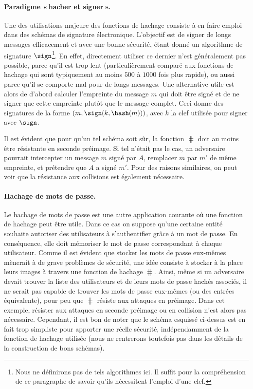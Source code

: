 \paragraph{Paradigme «\,hacher et signer\,».}
Une des utilisations majeure des fonctions de hachage consiste à en faire emploi dans des schémas de signature électronique.
L'objectif est de signer de longs messages efficacement et avec une bonne sécurité, étant donné un algorithme de signature
$\sign$\footnote{Nous ne définirons pas de tels algorithmes ici. Il suffit pour la compréhension de ce paragraphe
de savoir qu'ils nécessitent l'emploi d'une clef.}. En effet, directement utiliser ce dernier n'est généralement pas possible, parce qu'il est trop lent (particulièrement
comparé aux fonctions de hachage qui sont typiquement au moins $500$ à $1000$ fois plus rapide), ou aussi parce qu'il se comporte mal
pour de longs messages. Une alternative utile est alors de d'abord calculer l'empreinte du message $m$
qui doit être signé
et de ne signer que cette empreinte plutôt que le message complet.
Ceci donne des signatures de la forme $(m, \sign(k,\hash(m)))$, avec $k$ la clef utilisée pour signer avec $\sign$. 

Il est évident que pour qu'un tel schéma soit sûr, la fonction $\hash$ doit au moins être résistante en seconde préimage. Si tel n'était pas le cas, un adversaire
pourrait intercepter un message $m$ signé par $A$, remplacer $m$ par $m'$ de même empreinte, et prétendre que $A$ a signé $m'$.
Pour des raisons similaires, on peut voir que la résistance aux collisions est également nécessaire.

\paragraph{Hachage de mots de passe.} Le hachage de mots de passe est une autre application courante où une fonction
de hachage peut être utile. Dans ce cas
on suppose qu'une certaine entité souhaite autoriser des utilisateurs à s'authentifier grâce à un mot de passe.
En conséquence, elle doit mémoriser le mot de passe correspondant à chaque utilisateur. Comme il est évident que stocker les mots
de passe eux-mêmes mènerait à de grave problèmes de sécurité, une idée consiste à stocker à la place leurs images à travers une fonction
de hachage $\hash$. Ainsi, même si un adversaire devait trouver la liste des utilisateurs et de leurs mots de passe hachés associés, il ne serait
pas capable de trouver les mots de passe eux-mêmes (ou des entrées équivalente), pour peu que $\hash$ résiste aux attaques en préimage.
Dans cet exemple, résister aux attaques en seconde préimage ou en collision n'est alors pas nécessaire. Cependant, il est bon de noter
que le schéma esquissé ci-dessus est en fait trop simpliste pour apporter une réelle sécurité, indépendamment de la fonction de hachage
utilisée (nous ne rentrerons toutefois pas dans les détails de la construction de bons schémas).


